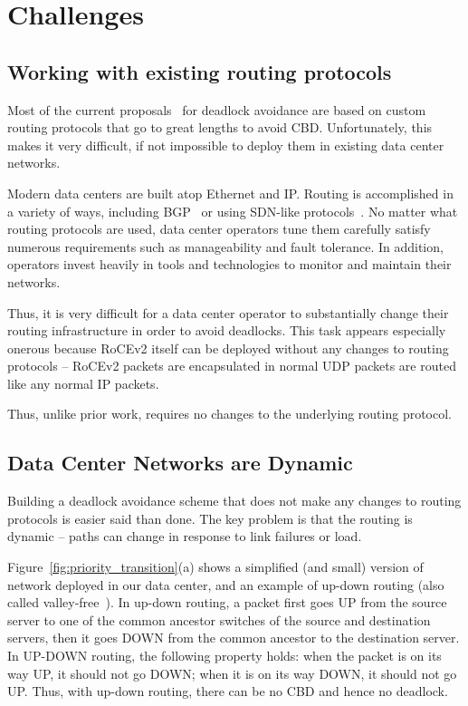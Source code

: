 \section{Challenges}
\label{sec:challenges}

\subsection{Working with existing routing protocols}
\label{sec:incremental}

Most of the current proposals~\cite{tcpbolt, karol2003prevention,
sancho2004,lash,wu2003fault} for deadlock avoidance are based on custom routing
protocols that go to great lengths to avoid CBD.  Unfortunately, this makes it
very difficult, if not impossible to deploy them in existing data center
networks. 

Modern data centers are built atop Ethernet and IP. Routing is accomplished in a
variety of ways, including BGP~\cite{vl2, facebookrouting} or using SDN-like
protocols~\cite{singh2015jupiter}.  No matter what routing protocols are used,
data center operators tune them carefully satisfy numerous requirements such as
manageability and fault tolerance.  In addition, operators invest heavily in
tools and technologies to monitor and maintain their networks.

Thus, it is very difficult for a data center operator to substantially change their routing
infrastructure in order to avoid deadlocks. This task appears especially
onerous because RoCEv2 itself can be deployed without any changes to routing
protocols -- RoCEv2 packets are encapsulated in normal UDP packets are routed
like any normal IP packets.

Thus, unlike prior work, \sysname{} requires no changes to the underlying routing
protocol.

\subsection{Data Center Networks are Dynamic}\label{sec:reroute}

Building a deadlock avoidance scheme that does not make any changes to routing
protocols is easier said than done. The key problem is that the routing is
dynamic -- paths can change in response to link failures or load.

Figure~\ref{fig:priority_transition}(a) shows a simplified (and small) version
of network deployed in our data center, and an example of up-down routing (also
called valley-free~\cite{qiu2007toward}).  In up-down routing, a packet first
goes UP from the source server to one of the common ancestor switches of the
source and destination servers, then it goes DOWN from the common ancestor to
the destination server.  In UP-DOWN routing, the following property holds: when
the packet is on its way UP, it should not go DOWN; when it is on its way DOWN,
it should not go UP. Thus, with up-down routing, there can be no CBD and hence
no deadlock.

